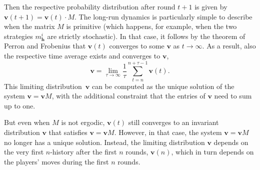 \documentclass[9pt,twoside,lineno]{pnas-new}
\theoremstyle{plainCl1}
\theoremstyle{plainCl2}
\begin{document}
Then the respective probability distribution after round $t\!+\!1$ is given by $\mathbf{v}(t\!+\!1) \!=\! \mathbf{v}(t)\cdot M$. 
The long-run dynamics is particularly simple to describe when the matrix $M$ is primitive (which happens, for example, when the two strategies $m^i_\mathbf{h}$ are strictly stochastic). 
In that case, it follows by the theorem of Perron and Frobenius that $\mathbf{v}(t)$ converges to some $\mathbf{v}$ as $t\to \infty$. 
As a result, also the respective time average exists and converges to $\mathbf{v}$,
\begin{equation} \label{Eq:TimeAverage}
\mathbf{v} = \lim_{\tau\to\infty} \frac{1}{\tau} \sum_{t=n}^{n+\tau-1} \mathbf{v}(t).  
\end{equation}
This limiting distribution~$\mathbf{v}$ can be computed as the unique solution of the system $\mathbf{v} \!=\! \mathbf{v}M$, with the additional constraint that the entries of $\mathbf{v}$ need to sum up to one. 

But even when $M$ is not ergodic, $\mathbf{v}(t)$ still converges to an invariant distribution $\mathbf{v}$ that satisfies $\mathbf{v} \!=\! \mathbf{v}M$.
However, in that case, the system  $\mathbf{v} \!=\! \mathbf{v}M$ no longer has a unique solution. 
Instead, the limiting distribution $\mathbf{v}$ depends on the very first $n$-history after the first $n$ rounds, $\mathbf{v}(n)$, which in turn depends on the players' moves during the first $n$ rounds.

\end{document}
